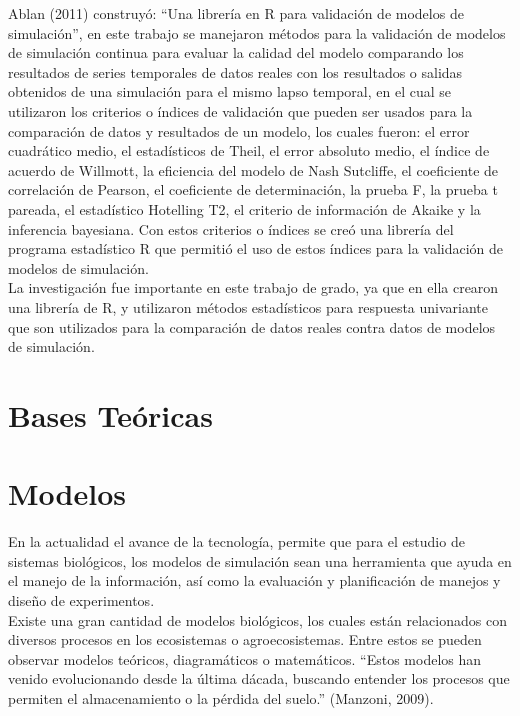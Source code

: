 Ablan (2011) construy\'o: “Una librer\'ia en R para validaci\'on de modelos de simulaci\'on”, en este trabajo se manejaron m\'etodos para la validaci\'on de modelos de simulaci\'on continua para evaluar la calidad del modelo comparando los resultados de series temporales de datos reales con los resultados o salidas obtenidos de una simulaci\'on para el mismo lapso temporal, en el cual se utilizaron los criterios o \'indices de validaci\'on que pueden ser usados para la comparaci\'on de datos y resultados de un modelo, los cuales fueron: el error cuadr\'atico medio, el estad\'isticos de Theil, el error absoluto medio, el \'indice de acuerdo de Willmott, la eficiencia del modelo de Nash Sutcliffe, el coeficiente de correlaci\'on de Pearson, el coeficiente de determinaci\'on, la prueba F, la prueba t pareada, el estad\'istico Hotelling T2, el criterio de informaci\'on de Akaike y la inferencia bayesiana. Con estos criterios o \'indices se cre\'o una librer\'ia del programa estad\'istico R que permiti\'o el uso de estos \'indices para la validaci\'on de modelos de simulaci\'on.\\

La investigaci\'on fue importante en este trabajo de grado, ya que en ella crearon una librer\'ia de R, y utilizaron m\'etodos estad\'isticos para respuesta univariante que son utilizados para la comparaci\'on de datos reales contra datos de modelos de simulaci\'on.\\

\section{Bases Te\'oricas}

\section{Modelos}

En la actualidad el avance de la tecnolog\'ia, permite que para el estudio de sistemas biol\'ogicos,  los modelos de simulaci\'on sean una herramienta que ayuda en el manejo de la informaci\'on, as\'i como la evaluaci\'on y planificaci\'on de manejos y dise\~no de experimentos.\\

Existe una gran cantidad de modelos biol\'ogicos, los cuales est\'an relacionados con diversos procesos en los ecosistemas o agroecosistemas. Entre estos se pueden observar modelos te\'oricos, diagram\'aticos o matem\'aticos. “Estos modelos han venido evolucionando desde la \'ultima d\'acada, buscando entender los procesos que permiten el almacenamiento o la p\'erdida del suelo.” (Manzoni, 2009).\\

